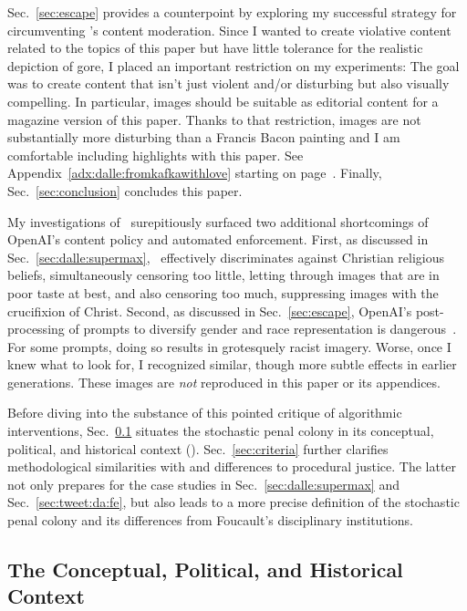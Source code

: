 Sec.\ \ref{sec:escape} provides a counterpoint by exploring my successful
strategy for circumventing \DALLE's content moderation. Since I wanted to create
violative content related to the topics of this paper but have little tolerance
for the realistic depiction of gore, I placed an important restriction on my
experiments: The goal was to create content that isn't just violent and/or
disturbing but also visually compelling. In particular, images should be
suitable as editorial content for a magazine version of this paper. Thanks to
that restriction, images are not substantially more disturbing than a Francis
Bacon painting and I am comfortable including highlights with this paper. See
Appendix~\ref{adx:dalle:fromkafkawithlove} starting on
page~\pageref{adx:dalle:fromkafkawithlove}. Finally, Sec.\ \ref{sec:conclusion}
concludes this paper.

My investigations of \DALLE\ surepitiously surfaced two additional shortcomings
of OpenAI's content policy and automated enforcement. First, as discussed in
Sec.\ \ref{sec:dalle:supermax}, \DALLE\ effectively discriminates against
Christian religious beliefs, simultaneously censoring too little, letting
through images that are in poor taste at best, and also censoring too much,
suppressing images with the crucifixion of Christ. Second, as discussed in Sec.\
\ref{sec:escape}, OpenAI's post-processing of prompts to diversify gender and
race representation is dangerous~\cite{OpenAI2022e,Sparkes2022}. For some
prompts, doing so results in grotesquely racist imagery. Worse, once I knew what
to look for, I recognized similar, though more subtle effects in earlier
generations. These images are \emph{not} reproduced in this paper or its
appendices.

Before diving into the substance of this pointed critique of algorithmic
interventions, Sec.\ \ref{sec:penal:context} situates the stochastic penal
colony in its conceptual, political, and historical context (). Sec.\
\ref{sec:criteria} further clarifies methodological similarities with and
differences to procedural justice. The latter not only prepares for the case
studies in Sec.\ \ref{sec:dalle:supermax} and Sec.\ \ref{sec:tweet:da:fe}, but
also leads to a more precise definition of the stochastic penal colony and its
differences from Foucault's disciplinary institutions.


\subsection{The Conceptual, Political, and Historical Context}
\label{sec:penal:context}

